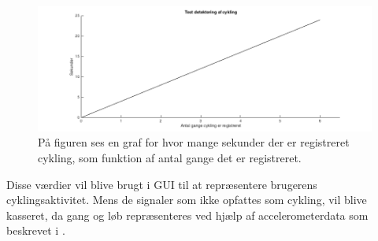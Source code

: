 \begin{figure}[H]
	\centering
	\includegraphics[width=.7\textwidth]{figures/cDesign/sim_n_c.png}
	\caption{På figuren ses en graf for hvor mange sekunder der er registreret cykling, som funktion af antal gange det er registreret.}
	\label{fig:sim_n_cykling}
\end{figure}

Disse værdier vil blive brugt i GUI til at repræsentere brugerens cyklingsaktivitet. Mens de signaler som ikke opfattes som cykling, vil blive kasseret, da gang og løb repræsenteres ved hjælp af accelerometerdata som beskrevet i . 